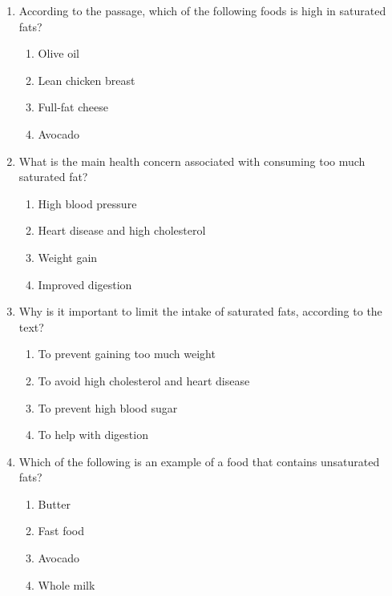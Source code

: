 \documentclass[12pt]{article}
\begin{document}
\begin{enumerate}

    \item According to the passage, which of the following foods is high in saturated fats?
    \begin{enumerate}[label=\Alph*.]
        \item Olive oil
        \item Lean chicken breast
        \item Full-fat cheese
        \item Avocado
    \end{enumerate}
    \vspace{0.5cm}

    \item What is the main health concern associated with consuming too much saturated fat?
    \begin{enumerate}[label=\Alph*.]
        \item High blood pressure
        \item Heart disease and high cholesterol
        \item Weight gain
        \item Improved digestion
    \end{enumerate}
    \vspace{0.5cm}

    \item Why is it important to limit the intake of saturated fats, according to the text?
    \begin{enumerate}[label=\Alph*.]
        \item To prevent gaining too much weight
        \item To avoid high cholesterol and heart disease
        \item To prevent high blood sugar
        \item To help with digestion
    \end{enumerate}
    \vspace{0.5cm}

    \item Which of the following is an example of a food that contains unsaturated fats?
    \begin{enumerate}[label=\Alph*.]
        \item Butter
        \item Fast food
        \item Avocado
        \item Whole milk
    \end{enumerate}
    \vspace{0.5cm}


\end{enumerate}
\end{document}
